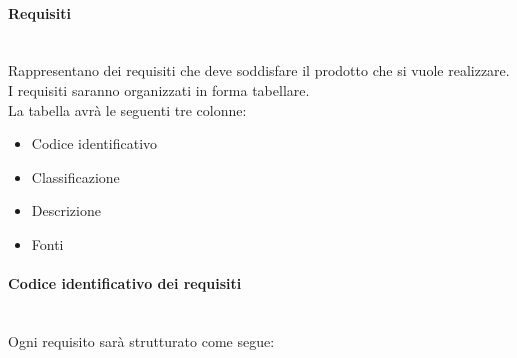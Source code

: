 \paragraph{Requisiti}\mbox{}\\
Rappresentano dei requisiti che deve soddisfare il prodotto che si vuole realizzare.\\
I requisiti saranno organizzati in forma tabellare.\\
La tabella avrà le seguenti tre colonne:
\begin{itemize}
	\item Codice identificativo
	\item Classificazione
	\item Descrizione
	\item Fonti
\end{itemize}
\paragraph{Codice identificativo dei requisiti}\mbox{}\\
Ogni requisito sarà strutturato come segue:
